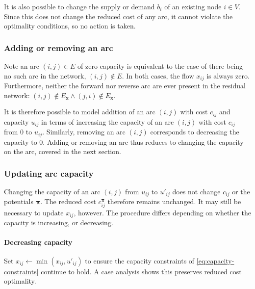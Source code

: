 It is also possible to change the supply or demand $b_i$ of an existing node $i \in V$\footnotemark. Since this does not change the reduced cost of any arc, it cannot violate the optimality conditions, so no action is taken.

\subsubsection{Adding or removing an arc}

Note an arc $(i,j) \in E$ of zero capacity is equivalent to the case of there being no such arc in the network, $(i,j) \not \in E$. In both cases, the flow $x_{ij}$ is always zero. Furthermore, neither the forward nor reverse arc are ever present in the residual network: $(i,j) \not \in E_\mathbf{x} \land (j,i) \not \in E_\mathbf{x}$.

It is therefore possible to model addition of an arc $(i,j)$ with cost $c_{ij}$ and capacity $u_{ij}$ in terms of increasing the capacity of an arc $(i,j)$ with cost $c_{ij}$ from $0$ to $u_{ij}$. Similarly, removing an arc $(i,j)$ corresponds to decreasing the capacity to $0$. Adding or removing an arc thus reduces to changing the capacity on the arc, covered in the next section.

\subsubsection{Updating arc capacity}

Changing the capacity of an arc $(i,j)$ from $u_{ij}$ to $u'_{ij}$ does not change $c_{ij}$ or the potentials $\boldsymbol{\pi}$. The reduced cost $c_{ij}^{\boldsymbol{\pi}}$ therefore remains unchanged. It may still be necessary to update $x_{ij}$, however. The procedure differs depending on whether the capacity is increasing, or decreasing.

\paragraph{Decreasing capacity}
Set $x_{ij} \gets \min\left(x_{ij},u'_{ij}\right)$ to ensure the capacity constraints of \cref{eq:capacity-constraints} continue to hold\footnotemark. A case analysis shows this preserves reduced cost optimality.

